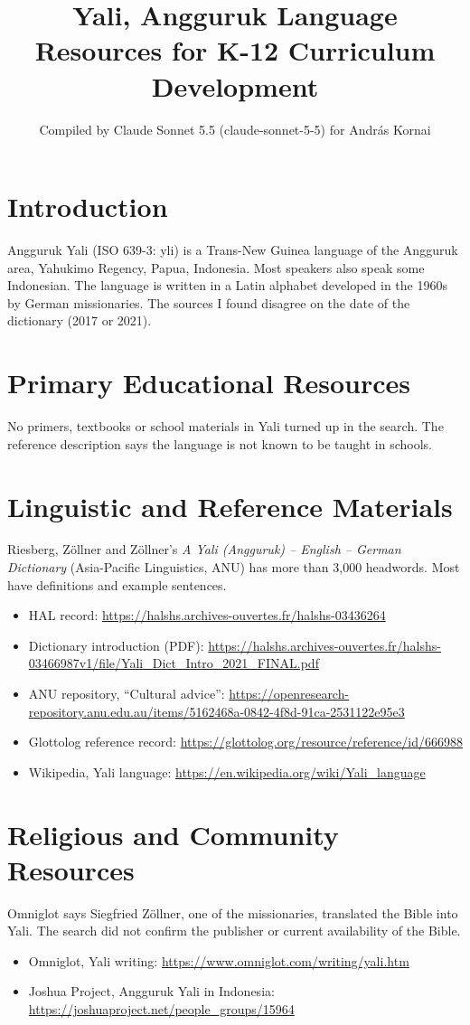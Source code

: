 \documentclass[12pt]{article}
\title{Yali, Angguruk Language Resources for K-12 Curriculum Development}
\author{Compiled by Claude Sonnet 5.5 (claude-sonnet-5-5) for Andr\'as Kornai}
\date{}
\begin{document}
\maketitle

\section{Introduction}
Angguruk Yali (ISO 639-3: yli) is a Trans-New Guinea language of the Angguruk area, Yahukimo Regency, Papua, Indonesia. Most speakers also speak some Indonesian. The language is written in a Latin alphabet developed in the 1960s by German missionaries. The sources I found disagree on the date of the dictionary (2017 or 2021).

\section{Primary Educational Resources}
No primers, textbooks or school materials in Yali turned up in the search. The reference description says the language is not known to be taught in schools.

\section{Linguistic and Reference Materials}
Riesberg, Z\"ollner and Z\"ollner's \emph{A Yali (Angguruk) -- English -- German Dictionary} (Asia-Pacific Linguistics, ANU) has more than 3,000 headwords. Most have definitions and example sentences.
\begin{itemize}
\item HAL record: \url{https://halshs.archives-ouvertes.fr/halshs-03436264}
\item Dictionary introduction (PDF): \url{https://halshs.archives-ouvertes.fr/halshs-03466987v1/file/Yali_Dict_Intro_2021_FINAL.pdf}
\item ANU repository, ``Cultural advice'': \url{https://openresearch-repository.anu.edu.au/items/5162468a-0842-4f8d-91ca-2531122e95e3}
\item Glottolog reference record: \url{https://glottolog.org/resource/reference/id/666988}
\item Wikipedia, Yali language: \url{https://en.wikipedia.org/wiki/Yali_language}
\end{itemize}

\section{Religious and Community Resources}
Omniglot says Siegfried Z\"ollner, one of the missionaries, translated the Bible into Yali. The search did not confirm the publisher or current availability of the Bible.
\begin{itemize}
\item Omniglot, Yali writing: \url{https://www.omniglot.com/writing/yali.htm}
\item Joshua Project, Angguruk Yali in Indonesia: \url{https://joshuaproject.net/people_groups/15964}
\end{itemize}
\end{document}
